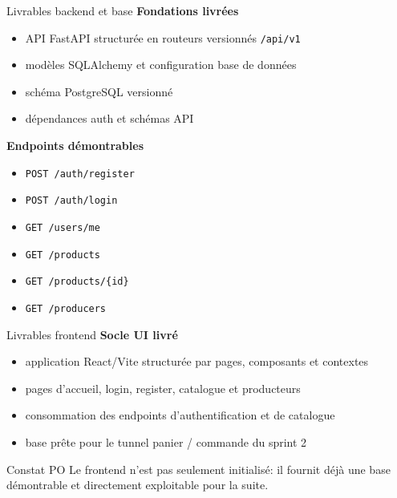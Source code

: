 \documentclass[10pt,aspectratio=169]{beamer}
\begin{document}
\begin{frame}{Livrables backend et base}
  \textbf{Fondations livrées}
  \begin{itemize}
    \item API FastAPI structurée en routeurs versionnés \texttt{/api/v1}
    \item modèles SQLAlchemy et configuration base de données
    \item schéma PostgreSQL versionné
    \item dépendances auth et schémas API
  \end{itemize}

  \vspace{0.3cm}

  \textbf{Endpoints démontrables}
  \begin{itemize}
    \item \texttt{POST /auth/register}
    \item \texttt{POST /auth/login}
    \item \texttt{GET /users/me}
    \item \texttt{GET /products}
    \item \texttt{GET /products/\{id\}}
    \item \texttt{GET /producers}
  \end{itemize}
\end{frame}

\begin{frame}{Livrables frontend}
  \textbf{Socle UI livré}
  \begin{itemize}
    \item application React/Vite structurée par pages, composants et contextes
    \item pages d'accueil, login, register, catalogue et producteurs
    \item consommation des endpoints d'authentification et de catalogue
    \item base prête pour le tunnel panier / commande du sprint 2
  \end{itemize}

  \vspace{0.3cm}

  \begin{block}{Constat PO}
    Le frontend n'est pas seulement initialisé: il fournit déjà une base démontrable et directement exploitable pour la suite.
  \end{block}
\end{frame}
\end{document}
